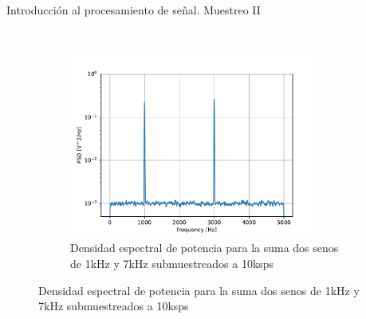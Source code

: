 \begin{frame}{Introducción al procesamiento de señal. Muestreo II}
\begin{columns}
{\begin{figure}
\begin{subfigure}[t]{0.5\textwidth}
					\includegraphics[width=0.9\textwidth]{../figures/pwelch_1k_7k_10k}
					\vspace*{-5pt}
					\caption{Densidad espectral de potencia para la suma dos senos de 1kHz y 7kHz submuestreados a 10ksps}
				\end{subfigure}
				\label{fig: aliasing}
			\end{figure}
		}
	\end{columns}
\end{frame}
